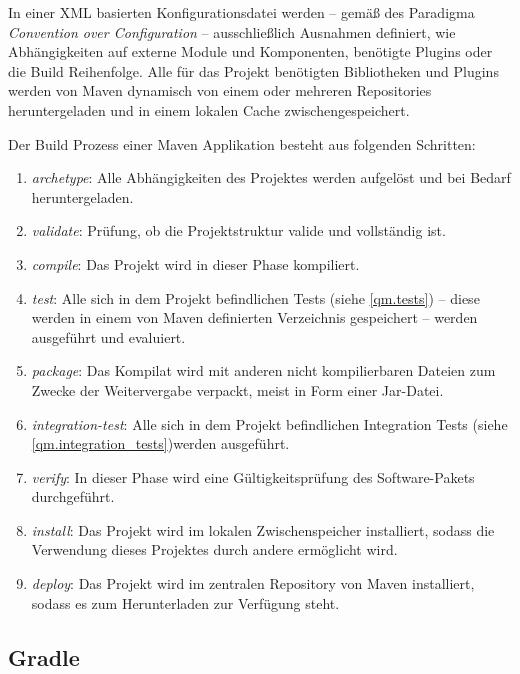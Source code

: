 			 In einer XML basierten Konfigurationsdatei werden -- gemäß des Paradigma \textit{Convention over Configuration} -- ausschließlich Ausnahmen definiert, wie Abhängigkeiten auf externe Module und Komponenten, benötigte Plugins oder die Build Reihenfolge. Alle für das Projekt benötigten Bibliotheken und Plugins werden von Maven dynamisch von einem oder mehreren Repositories heruntergeladen und in einem lokalen Cache zwischengespeichert. \cite{Company.2009}
			 
			 Der Build Prozess einer Maven Applikation besteht aus folgenden Schritten:
			 
			 \begin{enumerate}
			 	\item \textit{archetype}: Alle Abhängigkeiten des Projektes werden aufgelöst und bei Bedarf heruntergeladen.
			 	\item \textit{validate}: Prüfung, ob die Projektstruktur valide und vollständig ist.
			 	\item \textit{compile}: Das Projekt wird in dieser Phase kompiliert. 
			 	\item \textit{test}: Alle sich in dem Projekt befindlichen Tests (siehe \autoref{qm.tests}) -- diese werden in einem von Maven definierten Verzeichnis gespeichert -- werden ausgeführt und evaluiert.
			 	\item \textit{package}: Das Kompilat wird mit anderen nicht kompilierbaren Dateien zum Zwecke der Weitervergabe verpackt, meist in Form einer Jar-Datei.
			 	\item \textit{integration-test}: Alle sich in dem Projekt befindlichen Integration Tests (siehe \autoref{qm.integration_tests})werden ausgeführt. 
			 	\item \textit{verify}: In dieser Phase wird eine Gültigkeitsprüfung des Software-Pakets durchgeführt.
			 	\item \textit{install}: Das Projekt wird im lokalen Zwischenspeicher installiert, sodass die Verwendung dieses Projektes durch andere ermöglicht wird. 
			 	\item \textit{deploy}: Das Projekt wird im zentralen Repository von Maven installiert, sodass es zum Herunterladen zur Verfügung steht. 
			 \end{enumerate}
			 
		\subsection{Gradle}
		
			
		
